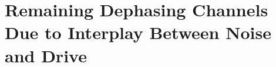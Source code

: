 \chapter{Remaining Dephasing Channels Due to Interplay Between Noise and Drive}
\label{chap:remaining_dephasing}





